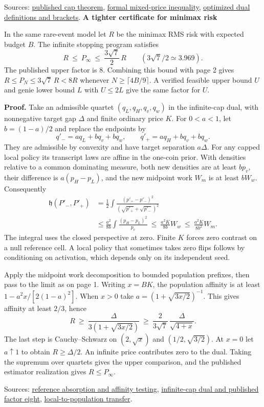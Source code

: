 \documentclass[11pt]{article}
\newcommand{\hd}{\mathfrak h}
\newcommand{\heading}[1]{{\LARGE\bfseries\color{ink} #1}\par\smallskip}
\newcommand{\src}[2]{\href{https://github.com/davidiach/adaptive-threshold-estimation/blob/97a501383083cc0fa64cb96405444048b8fd4053/#1}{#2}}
\begin{document}
{\small Sources: \src{paper/v6/appendix-cap-rate.tex}{published cap theorem},
\src{lean/ThresholdHC/GenieRate/Flow.lean}{formal mixed-price inequality},
\src{paper/v6/appendix-genie.tex}{optimized dual definitions and brackets}.}
\newpage
\heading{A tighter certificate for minimax risk}
In the same rare-event model let $R$ be the minimax RMS risk with expected budget $B$. The infinite stopping program satisfies
\[
       R\ \le\ P_\infty\ \le\ \frac{3\sqrt7}{2}\,R
       \qquad (3\sqrt7/2 \simeq 3.969).
\]
The published upper factor is $8$. Combining this bound with page 2 gives $R\le P_N\le 3\sqrt7\,R<8R$ whenever $N\ge\lceil4B/9\rceil$. A verified feasible upper bound $U$ and genie lower bound $L$ with $U\le2L$ give the same factor for $U$.

\textbf{Proof.} Take an admissible quartet $(q_L,q_H,q_v,q_w)$ in the infinite-cap dual, with nonnegative target gap $\Delta$ and finite ordinary price $K$. For $0<a<1$, let $b=(1-a)/2$ and replace the endpoints by
\[
 q'_- = a q_L+bq_v+bq_w,\qquad
 q'_+ = a q_H+bq_v+bq_w.
\]
They are admissible by convexity and have target separation $a\Delta$. For any capped local policy its transcript laws are affine in the one-coin prior. With densities relative to a common dominating measure, both new densities are at least $b p_v$, their difference is $a(p_H-p_L)$, and the new midpoint work $W_m$ is at least $b W_w$. Consequently
\begin{align*}
 \hd(P'_-,P'_+)
 &=\tfrac12\int \frac{(p'_+-p'_-)^2}
                         {(\sqrt{p'_+}+\sqrt{p'_-})^2}\\
 &\le \frac{a^2}{8b}\int\frac{(p_H-p_L)^2}{p_v}
 \ \le\ \frac{a^2 K}{8b}W_w
 \ \le\ \frac{a^2 K}{8b^2}W_m .
\end{align*}
The integral uses the closed perspective at zero. Finite $K$ forces zero contrast on a null reference cell. A local policy that sometimes takes zero flips follows by conditioning on activation, which depends only on its independent seed.

Apply the midpoint work decomposition to bounded population prefixes, then pass to the limit as on page 1. Writing $x=BK$, the population affinity is at least $1-a^2x/[2(1-a)^2]$. When $x>0$ take $a=(1+\sqrt{3x/2})^{-1}$. This gives affinity at least $2/3$, hence
\[
 R\ \ge\ \frac{\Delta}{3(1+\sqrt{3x/2})}
 \ \ge\ \frac{2}{3\sqrt7}\,\frac{\Delta}{\sqrt{4+x}}.
\]
The last step is Cauchy--Schwarz on $(2,\sqrt{x})$ and $(1/2,\sqrt{3/2})$. At $x=0$ let $a\uparrow1$ to obtain $R\ge\Delta/2$. An infinite price contributes zero to the dual. Taking the supremum over quartets gives the upper comparison, and the published estimator realization gives $R\le P_\infty$.

{\small Sources: \src{paper/v6/appendix-dual.tex}{reference absorption and affinity testing},
\src{paper/v6/appendix-genie.tex}{infinite-cap dual and published factor eight},
\src{paper/v6/appendix-transfer-foundations.tex}{local-to-population transfer}.}
\end{document}
